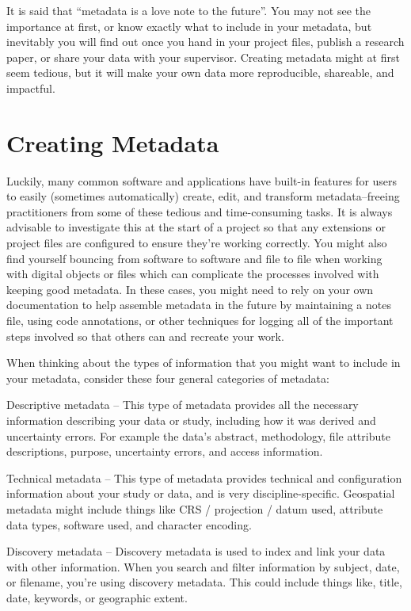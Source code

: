 \documentclass[
]{book}
\begin{document}
It is said that ``metadata is a love note to the future''. You may not see the importance at first, or know exactly what to include in your metadata, but inevitably you will find out once you hand in your project files, publish a research paper, or share your data with your supervisor. Creating metadata might at first seem tedious, but it will make your own data more reproducible, shareable, and impactful.

\hypertarget{creating-metadata}{%
\section{Creating Metadata}\label{creating-metadata}}

Luckily, many common software and applications have built-in features for users to easily (sometimes automatically) create, edit, and transform metadata--freeing practitioners from some of these tedious and time-consuming tasks. It is always advisable to investigate this at the start of a project so that any extensions or project files are configured to ensure they're working correctly. You might also find yourself bouncing from software to software and file to file when working with digital objects or files which can complicate the processes involved with keeping good metadata. In these cases, you might need to rely on your own documentation to help assemble metadata in the future by maintaining a notes file, using code annotations, or other techniques for logging all of the important steps involved so that others can and recreate your work.

When thinking about the types of information that you might want to include in your metadata, consider these four general categories of metadata:

Descriptive metadata -- This type of metadata provides all the necessary information describing your data or study, including how it was derived and uncertainty errors. For example the data's abstract, methodology, file attribute descriptions, purpose, uncertainty errors, and access information.

Technical metadata -- This type of metadata provides technical and configuration information about your study or data, and is very discipline-specific. Geospatial metadata might include things like CRS / projection / datum used, attribute data types, software used, and character encoding.

Discovery metadata -- Discovery metadata is used to index and link your data with other information. When you search and filter information by subject, date, or filename, you're using discovery metadata. This could include things like, title, date, keywords, or geographic extent.
\end{document}
